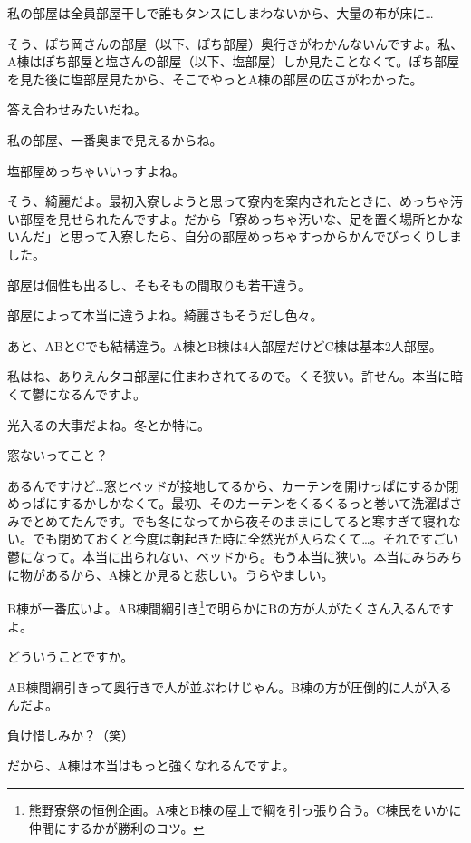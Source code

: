 \begin{multicols}{2}
  私の部屋は全員部屋干しで誰もタンスにしまわないから、大量の布が床に…

  そう、ぽち岡さんの部屋（以下、ぽち部屋）奥行きがわかんないんですよ。私、A棟はぽち部屋と塩さんの部屋（以下、塩部屋）しか見たことなくて。ぽち部屋を見た後に塩部屋見たから、そこでやっとA棟の部屋の広さがわかった。

  答え合わせみたいだね。

  私の部屋、一番奥まで見えるからね。

  塩部屋めっちゃいいっすよね。

  そう、綺麗だよ。最初入寮しようと思って寮内を案内されたときに、めっちゃ汚い部屋を見せられたんですよ。だから「寮めっちゃ汚いな、足を置く場所とかないんだ」と思って入寮したら、自分の部屋めっちゃすっからかんでびっくりしました。

  部屋は個性も出るし、そもそもの間取りも若干違う。

  部屋によって本当に違うよね。綺麗さもそうだし色々。

  あと、ABとCでも結構違う。A棟とB棟は4人部屋だけどC棟は基本2人部屋。

  私はね、ありえんタコ部屋に住まわされてるので。くそ狭い。許せん。本当に暗くて鬱になるんですよ。

  光入るの大事だよね。冬とか特に。

  窓ないってこと？

  あるんですけど…窓とベッドが接地してるから、カーテンを開けっぱにするか閉めっぱにするかしかなくて。最初、そのカーテンをくるくるっと巻いて洗濯ばさみでとめてたんです。でも冬になってから夜そのままにしてると寒すぎて寝れない。でも閉めておくと今度は朝起きた時に全然光が入らなくて…。それですごい鬱になって。本当に出られない、ベッドから。もう本当に狭い。本当にみちみちに物があるから、A棟とか見ると悲しい。うらやましい。

  B棟が一番広いよ。AB棟間綱引き\footnote{熊野寮祭の恒例企画。A棟とB棟の屋上で綱を引っ張り合う。C棟民をいかに仲間にするかが勝利のコツ。}で明らかにBの方が人がたくさん入るんですよ。

  どういうことですか。

  AB棟間綱引きって奥行きで人が並ぶわけじゃん。B棟の方が圧倒的に人が入るんだよ。

  負け惜しみか？（笑）

  だから、A棟は本当はもっと強くなれるんですよ。


\end{multicols}
